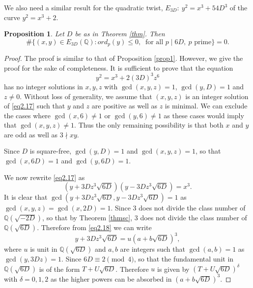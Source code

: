 \documentclass[12pt, 14paper,reqno]{amsart}
\theoremstyle{plain}
\newtheorem{prop}{Proposition}[section]
\theoremstyle{proof}
\numberwithin{equation}{section}
\begin{document}
We also need a similar result for the quadratic twist, $E_{3D}:~ y^2=x^3+54D^3$ of the curve $y^2=x^3+2$.  

\begin{prop}\label{prop2}
Let $D$ be as in Theorem \ref{thm}. Then $$\#\{(x,y)\in E_{3D}(\mathbb{Q}):ord_p(y)\leq 0, ~\text{ for all }p\mid 6D,~ p\text{ prime}\}=0.$$
\end{prop}
\begin{proof}
The proof is similar to that of Proposition \ref{prop1}. However, we give the proof for the sake of completeness.  It is sufficient to prove that the equation 
\begin{equation}\label{eq2.17}
y^2=x^3+2(3D)^3z^6
\end{equation}
has no integer solutions in $x,y,z$ with $\gcd(x,y,z)=1$, $\gcd(y,D)=1$ and $z\ne 0$. Without loss of generality, we assume that $(x,y,z)$ is an integer solution of \eqref{eq2.17} such that $y$ and $z$ are positive as well as $z$ is minimal. We can exclude the cases where $\gcd(x,6)\ne1$ or $\gcd(y,6)\ne1$ as these cases would imply that $\gcd(x,y,z)\ne 1$. Thus the only remaining possibility is that both $x$ and $y$ are odd as well as $3\nmid xy$.

Since $D$ is square-free, $\gcd(y,D)=1$ and $\gcd(x,y,z)=1$, so that $\gcd(x,6D)=1$ and $\gcd(y,6D)=1$. 

We now rewrite \eqref{eq2.17} as 
\begin{equation}\label{eq2.18}
(y+3Dz^3\sqrt{6D})(y-3Dz^3\sqrt{6D})=x^3.
\end{equation}
It is clear that $\gcd(y+3Dz^3\sqrt{6D}, y-3Dz^3\sqrt{6D})=1$ as $\gcd(x,y,z)=\gcd(x,2D)=1$. 
Since $3$ does not divide the class number of $\mathbb{Q}(\sqrt{-2D})$, so that by 
Theorem \ref{thmsc}, $3$ does not divide the class number of $\mathbb{Q}(\sqrt{6D})$. Therefore from \eqref{eq2.18} we can write
\begin{equation}\label{eq2.19}
y+3Dz^3\sqrt{6D}=u(a+b\sqrt{6D})^3,
\end{equation}
where $u$ is unit in $\mathbb{Q}(\sqrt{6D})$ and $a, b$ are integers such that $\gcd(a, b)=1$ as $\gcd(y, 3Dz)=1$. Since $6D\equiv 2\pmod 4$, so that the fundamental unit in $\mathbb{Q}(\sqrt{6D})$ is of the form $ T+U\sqrt{6D}$. Therefore $u$ is given by $(T+U\sqrt{6D})^\delta$ with $\delta=0,1,2$ as the higher powers can be absorbed in  $(a+b\sqrt{6D})^3$. 


\end{proof}
\end{document}
